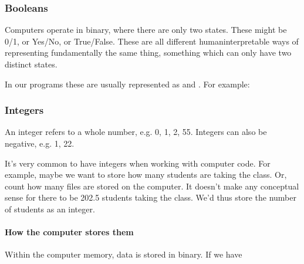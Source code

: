 \documentclass[letterpaper,10pt,british]{sphinxmanual}
\begin{document}
\sphinxstepscope


\subsubsection{Booleans}
\label{\detokenize{chapters/programming_fundamentals/booleans:booleans}}\label{\detokenize{chapters/programming_fundamentals/booleans::doc}}
\sphinxAtStartPar
Computers operate in binary, where there are only two states. These might be 0/1, or Yes/No, or True/False. These are all different human\sphinxhyphen{}interpretable ways of representing fundamentally the same thing, something which can only have two distinct states.

\sphinxAtStartPar
In our programs these are usually represented as  and . For example:

\begin{sphinxVerbatim}[commandchars=\\\{\}]
  
\end{sphinxVerbatim}

\sphinxstepscope


\subsubsection{Integers}
\label{\detokenize{chapters/programming_fundamentals/integers:integers}}\label{\detokenize{chapters/programming_fundamentals/integers::doc}}
\sphinxAtStartPar
An integer refers to a whole number, e.g. 0, 1, 2, 55. Integers can also be negative, e.g. \sphinxhyphen{}1, \sphinxhyphen{}22.

\sphinxAtStartPar
It’s very common to have integers when working with computer code. For example, maybe we want to store how many students are taking the class. Or, count how many files are stored on the computer. It doesn’t make any conceptual sense for there to be 202.5 students taking the class. We’d thus store the number of students as an integer.


\paragraph{How the computer stores them}
\label{\detokenize{chapters/programming_fundamentals/integers:how-the-computer-stores-them}}
\sphinxAtStartPar
Within the computer memory, data is stored in binary. If we have

\begin{sphinxVerbatim}[commandchars=\\\{\}]
  
\end{sphinxVerbatim}
\end{document}
